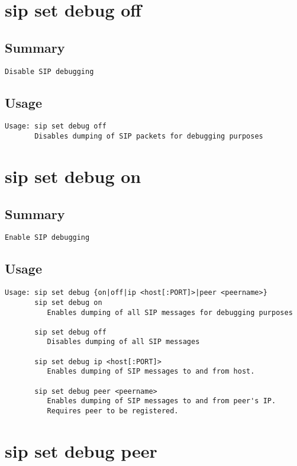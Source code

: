 \section{sip set debug off}
\subsection{Summary}
\begin{verbatim}
Disable SIP debugging
\end{verbatim}
\subsection{Usage}
\begin{verbatim}
Usage: sip set debug off
       Disables dumping of SIP packets for debugging purposes

\end{verbatim}


\section{sip set debug on}
\subsection{Summary}
\begin{verbatim}
Enable SIP debugging
\end{verbatim}
\subsection{Usage}
\begin{verbatim}
Usage: sip set debug {on|off|ip <host[:PORT]>|peer <peername>}
       sip set debug on
          Enables dumping of all SIP messages for debugging purposes

       sip set debug off
          Disables dumping of all SIP messages

       sip set debug ip <host[:PORT]>
          Enables dumping of SIP messages to and from host.

       sip set debug peer <peername>
          Enables dumping of SIP messages to and from peer's IP.
          Requires peer to be registered.

\end{verbatim}


\section{sip set debug peer}
